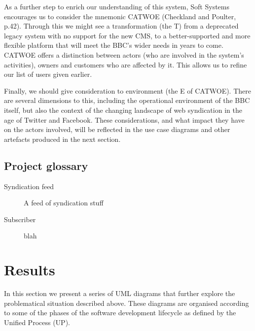 \documentclass{article}
\begin{document}
As a further step to enrich our understanding of this system, Soft Systems encourages us to consider the mnemonic CATWOE (Checkland and Poulter, p.42). Through this we might see a transformation (the T) from a deprecated legacy system with no support for the new CMS, to a better-supported and more flexible platform that will meet the BBC's wider needs in years to come. CATWOE offers a distinction between actors (who are involved in the system's activities), owners and customers who are affected by it. This allows us to refine our list of users given earlier.

Finally, we should give consideration to environment (the E of CATWOE). There are several dimensions to this, including the operational environment of the BBC itself, but also the context of the changing landscape of web syndication in the age of Twitter and Facebook. These considerations, and what impact they have on the actors involved, will be reflected in the use case diagrams and other artefacts produced in the next section.




\subsection{Project glossary}

\begin{description}

\item [Syndication feed]
A feed of syndication stuff

\item [Subscriber]
blah

\end{description}

\section{Results}

In this section we present a series of UML diagrams that further explore the problematical situation described above. These diagrams are organised according to some of the phases of the software development lifecycle as defined by the Unified Process (UP).
\end{document}
